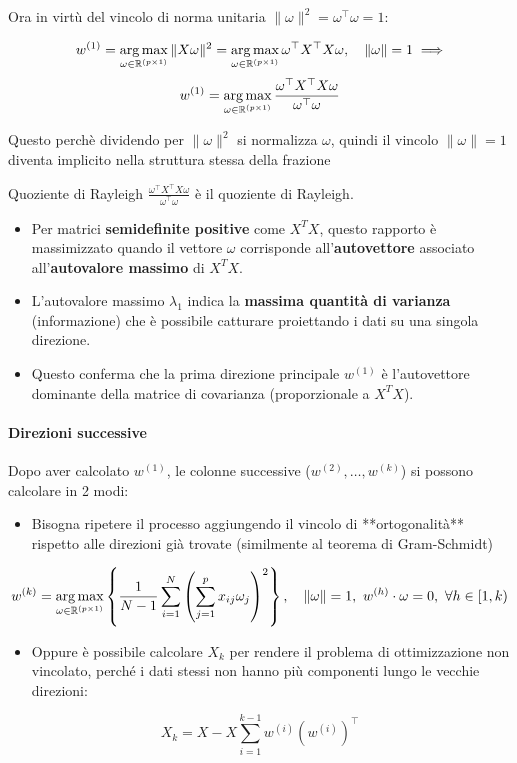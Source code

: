 	Ora in virtù del vincolo di norma unitaria $\|\omega\|^2 = \omega^\top \omega = 1$:
	
	$$
	w^{(1)} = \operatorname*{arg\,max}_{\omega \in \mathbb{R}^{(p\times1)}} \| X \omega \|^2 = \operatorname*{arg\,max}_{\omega \in \mathbb{R}^{(p\times1)}} \omega^\top X^\top X \omega,\quad \|\omega\|=1\implies\\[.2cm]
	$$
	$$
	w^{(1)} = \operatorname*{arg\,max}_{\omega \in \mathbb{R}^{(p\times1)}}\frac{\omega^\top X^\top X \omega}{\omega^\top \omega}
	$$
	
	Questo perchè dividendo per $\|\omega\|^2$ si normalizza $\omega$, quindi il vincolo $\|\omega\|=1$ diventa implicito nella struttura stessa della frazione
	
	\begin{mybox2}{Quoziente di Rayleigh}
		$\frac{\omega^\top X^\top X \omega}{\omega^\top \omega}$
		è il quoziente di Rayleigh.
		
		\begin{itemize}[itemsep=3pt, topsep=3pt]
		  \item Per matrici \textbf{semidefinite positive} come $X^TX$, questo rapporto è massimizzato quando il vettore $\omega$ corrisponde all'\textbf{autovettore} associato all'\textbf{autovalore massimo} di $X^TX$.
		  \item L'autovalore massimo $\lambda_1$ indica la \textbf{massima quantità di varianza} (informazione) che è possibile catturare proiettando i dati su una singola direzione.
		  \item Questo conferma che la prima direzione principale $w^{(1)}$ è l'autovettore dominante della matrice di covarianza (proporzionale a $X^TX$).
		\end{itemize}
	\end{mybox2}
	
	
	\paragraph{Direzioni successive}
	
	Dopo aver calcolato $w^{(1)}$, le colonne successive ($w^{(2)}, \dots, w^{(k)}$) si possono calcolare in 2 modi:
	
	\begin{itemize}[itemsep=3pt, topsep=3pt]
	  \item Bisogna ripetere il processo aggiungendo il vincolo di **ortogonalità** rispetto alle direzioni già trovate (similmente al teorema di Gram-Schmidt)
	\end{itemize}
	$$
	w^{(k)} = \argmax_{\omega\in \mathbb{R}^{(p\times1)}} \left\{ \frac{1}{N-1} \sum_{i=1}^{N} \left( \sum_{j=1}^{p} x_{ij} \omega_j \right)^2 \right\},\quad \|\omega\|=1,\ w^{(h)}\cdot\omega=0,\ \forall h\in[1,k)
	$$
	\begin{itemize}[itemsep=3pt, topsep=3pt]
	  \item Oppure è possibile calcolare $X_k$ per rendere il problema di ottimizzazione non vincolato, perché i dati stessi non hanno più componenti lungo le vecchie direzioni:
	\end{itemize}
	$$
	X_{k}=X-X\sum_{i=1}^{k-1}w^{(i)}(w^{(i)})^{\top}
	$$
	
